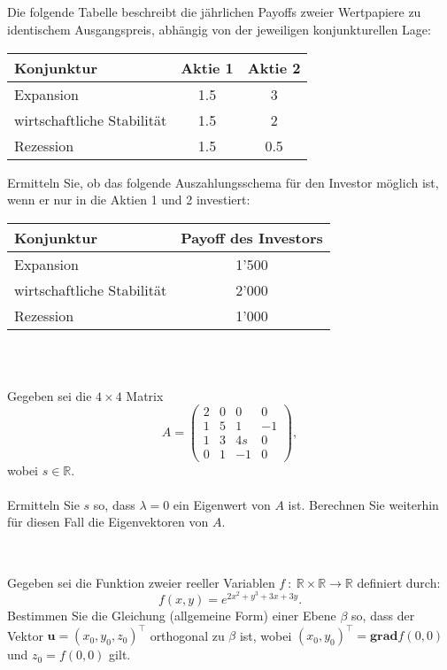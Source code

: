 \subsection*{}
Die folgende Tabelle beschreibt die jährlichen Payoffs zweier Wertpapiere zu identischem Ausgangspreis,
abhängig von der jeweiligen konjunkturellen Lage:
\begin{table}[H]
\centering
\begin{tabular}{lcc}
\hline 
Konjunktur & Aktie 1 & Aktie 2 \\ 
\hline 
Expansion & 1.5 & 3 \\ 
wirtschaftliche Stabilität & 1.5 & 2 \\ 
Rezession & 1.5 & 0.5 \\ 
\hline 
\end{tabular} 
\end{table}
Ermitteln Sie, ob das folgende Auszahlungsschema für den Investor möglich ist,
wenn er nur in die Aktien 1 und 2 investiert:
\begin{table}[H]
\centering
\begin{tabular}{lc}
\hline 
Konjunktur & Payoff des Investors \\ 
\hline 
Expansion & 1'500 \\ 
wirtschaftliche Stabilität & 2'000 \\ 
Rezession & 1'000 \\ 
\hline 
\end{tabular} 
\end{table}
\ \\
\subsection*{}
Gegeben sei die $4 \times 4$ Matrix
\begin{equation*}
A= 
\begin{pmatrix}
2 & 0 &0 & 0 \\
1 & 5 & 1  & -1\\
1 & 3 & 4s & 0 \\
0 & 1 & -1 & 0
\end{pmatrix},
\end{equation*}
wobei $s \in \mathbb{R}$.\\ \\
Ermitteln Sie $s$ so, dass $\lambda = 0$ ein Eigenwert von $A$ ist.
Berechnen Sie weiterhin für diesen Fall die Eigenvektoren von $A$.
\\
\\
\subsection*{}
Gegeben sei die Funktion zweier reeller Variablen 
$f \ : \ \mathbb{R}\times \mathbb{R} \to \mathbb{R}$ definiert durch:
\begin{equation*}
f(x,y) = e^{2x^2+y^3 +3x +3y}.
\end{equation*}
Bestimmen Sie die Gleichung (allgemeine Form) einer Ebene $\beta$ so,
dass der Vektor $\textbf{u} = (x_0,y_0,z_0)^\top$ orthogonal zu $\beta$ ist,
wobei $(x_0,y_0)^\top = \textbf{grad} f(0,0)$ und $z_0 = f(0,0)$ gilt.
\\
\\
